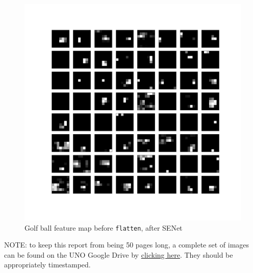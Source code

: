 \documentclass{article}
\begin{document}
\begin{appendices}
\begin{figure}[H]
    \centering
    \includegraphics[width=6in]{csci-8110/hw-3/images/golf-post-SENet-block5_pool-2020-11-05 18_44_11.709641_output.png}
    \caption{Golf ball feature map before \lstinline{flatten}, after SENet}
    \label{fig:golf_5_post}
\end{figure}

\par NOTE: to keep this report from being 50 pages long, a complete set of images can be found on the UNO Google Drive by \href{https://drive.google.com/drive/folders/1thcSPIT0QEPa8tnmXHmzTmB66VScgZe-?usp=sharing}{clicking here}. They should be appropriately timestamped.

\end{appendices}
\end{document}
